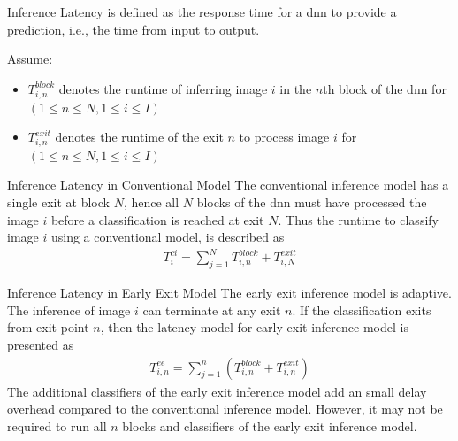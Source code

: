 \begin{enumdescript}
	\item[Inference Latency] is defined as the response time for a \gls{dnn} to provide a prediction, i.e., the time from input to output. 
	
	Assume:
	\begin{itemize}
		\item $T_{i,n}^{block}$ denotes the runtime of inferring image $ i $ in the $ n $th block of the \gls{dnn} for $ \left(1\leq n \leq N, 1 \leq i \leq I\right) $
		\item $T_{i,n}^{exit}$ denotes the runtime of the exit $ n $  to process image $i$ for $ \left(1\leq n \leq N, 1 \leq i \leq I\right) $
	\end{itemize}
	\begin{enumdescript}
		\item[Inference Latency in Conventional Model] The conventional inference model has a single exit at block $ N $, hence all $ N $ blocks of the \gls{dnn} must have processed the image $ i $ before a classification is reached at exit $ N $. Thus the runtime to classify image $ i $ using a conventional model, is described as
		\begin{align}
		T^{ci}_{i}= \sum_{j=1}^{N} T_{i,n}^{block} + T_{i,N}^{exit}
		\end{align}
		\item[Inference Latency in Early Exit Model] The early exit inference model is adaptive. The inference of image $ i $ can terminate at any exit $ n $. If the classification exits from exit point $ n $, then the latency model for early exit inference model is presented as
		\begin{align}
		T_{i,n}^{ee}=\sum_{j=1}^{n} \left(T_{i,n}^{block} + T_{i,n}^{exit} \right) 
		\end{align}
		The additional classifiers of the early exit inference model add an small delay overhead compared to the conventional inference model. However, it may not be required to run all $ n $ blocks and classifiers of the early exit inference model. 
	\end{enumdescript}
	

\end{enumdescript}
